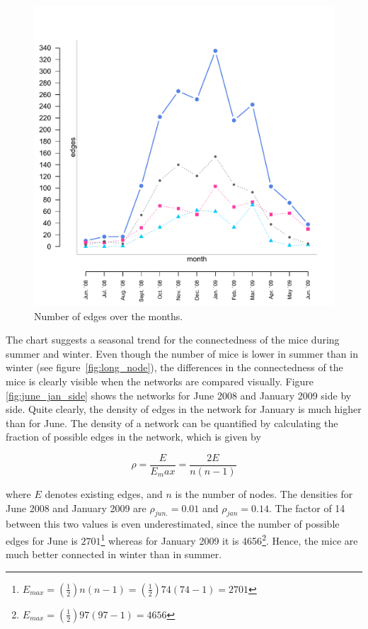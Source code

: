 \begin{figure}[htpb]
\begin{center}
  \includegraphics[width=.6\textwidth]{assets/pdf/long_edges.pdf}
  \caption[Number of edges over the months]{Number of edges over the months.}
  \label{fig:long_edges}
\end{center}
\end{figure}

The chart suggests a seasonal trend for the connectedness of the mice during summer and winter. Even though the number of mice is lower in summer than in winter (see figure~\ref{fig:long_node}), the differences in the connectedness of the mice is clearly visible when the networks are compared visually. Figure \ref{fig:june_jan_side} shows the networks for June 2008 and January 2009 side by side. Quite clearly, the density of edges in the network for January is much higher than for June. The density of a network can be quantified by calculating the fraction of possible edges in the network, which is given by 

\begin{equation}
\rho = \frac{E}{E_max} = \frac{2E}{n(n-1)}
\label{eq:density}
\end{equation}      

where $E$ denotes existing edges, and $n$ is the number of nodes. The densities for June 2008 and January 2009 are $\rho_{jun.} = 0.01$ and $\rho_{jan} = 0.14$. The factor of 14 between this two values is even underestimated, since the number of possible edges for June is $2701$\footnote{$E_{max} = (\frac{1}{2})n(n-1) = (\frac{1}{2}) 74(74 -1) = 2701$} whereas for January 2009 it is 4656\footnote{$E_{max} = (\frac{1}{2}) 97(97-1)  = 4656$}. Hence, the mice are much better connected in winter than in summer.  

